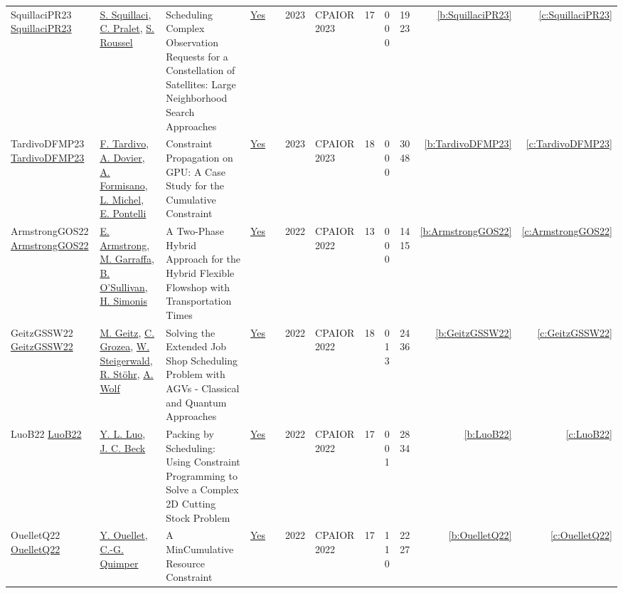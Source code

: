 {\begin{longtable}{>{\raggedright\arraybackslash}p{3cm}>{\raggedright\arraybackslash}p{4.5cm}>{\raggedright\arraybackslash}p{6.0cm}rrrp{2.5cm}rp{1cm}p{1cm}rr}
SquillaciPR23 \href{https://doi.org/10.1007/978-3-031-33271-5_29}{SquillaciPR23} & \hyperref[auth:a20]{S. Squillaci}, \hyperref[auth:a21]{C. Pralet}, \hyperref[auth:a22]{S. Roussel} & Scheduling Complex Observation Requests for a Constellation of Satellites: Large Neighborhood Search Approaches & \href{../works/SquillaciPR23.pdf}{Yes} & \cite{SquillaciPR23} & 2023 & CPAIOR 2023 & 17 & 0 0 0 & 19 23 & \ref{b:SquillaciPR23} & \ref{c:SquillaciPR23}\\
TardivoDFMP23 \href{https://doi.org/10.1007/978-3-031-33271-5_22}{TardivoDFMP23} & \hyperref[auth:a29]{F. Tardivo}, \hyperref[auth:a30]{A. Dovier}, \hyperref[auth:a31]{A. Formisano}, \hyperref[auth:a32]{L. Michel}, \hyperref[auth:a33]{E. Pontelli} & Constraint Propagation on {GPU:} {A} Case Study for the Cumulative Constraint & \href{../works/TardivoDFMP23.pdf}{Yes} & \cite{TardivoDFMP23} & 2023 & CPAIOR 2023 & 18 & 0 0 0 & 30 48 & \ref{b:TardivoDFMP23} & \ref{c:TardivoDFMP23}\\
ArmstrongGOS22 \href{https://doi.org/10.1007/978-3-031-08011-1_1}{ArmstrongGOS22} & \hyperref[auth:a14]{E. Armstrong}, \hyperref[auth:a15]{M. Garraffa}, \hyperref[auth:a16]{B. O'Sullivan}, \hyperref[auth:a17]{H. Simonis} & \cellcolor{green!10}A Two-Phase Hybrid Approach for the Hybrid Flexible Flowshop with Transportation Times & \href{../works/ArmstrongGOS22.pdf}{Yes} & \cite{ArmstrongGOS22} & 2022 & CPAIOR 2022 & 13 & 0 0 0 & 14 15 & \ref{b:ArmstrongGOS22} & \ref{c:ArmstrongGOS22}\\
GeitzGSSW22 \href{https://doi.org/10.1007/978-3-031-08011-1_10}{GeitzGSSW22} & \hyperref[auth:a47]{M. Geitz}, \hyperref[auth:a48]{C. Grozea}, \hyperref[auth:a49]{W. Steigerwald}, \hyperref[auth:a50]{R. St{\"{o}}hr}, \hyperref[auth:a51]{A. Wolf} & \cellcolor{green!10}Solving the Extended Job Shop Scheduling Problem with AGVs - Classical and Quantum Approaches & \href{../works/GeitzGSSW22.pdf}{Yes} & \cite{GeitzGSSW22} & 2022 & CPAIOR 2022 & 18 & 0 1 3 & 24 36 & \ref{b:GeitzGSSW22} & \ref{c:GeitzGSSW22}\\
LuoB22 \href{https://doi.org/10.1007/978-3-031-08011-1_17}{LuoB22} & \hyperref[auth:a745]{Y. L. Luo}, \hyperref[auth:a89]{J. C. Beck} & Packing by Scheduling: Using Constraint Programming to Solve a Complex 2D Cutting Stock Problem & \href{../works/LuoB22.pdf}{Yes} & \cite{LuoB22} & 2022 & CPAIOR 2022 & 17 & 0 0 1 & 28 34 & \ref{b:LuoB22} & \ref{c:LuoB22}\\
OuelletQ22 \href{https://doi.org/10.1007/978-3-031-08011-1_21}{OuelletQ22} & \hyperref[auth:a52]{Y. Ouellet}, \hyperref[auth:a37]{C.-G. Quimper} & A MinCumulative Resource Constraint & \href{../works/OuelletQ22.pdf}{Yes} & \cite{OuelletQ22} & 2022 & CPAIOR 2022 & 17 & 1 1 0 & 22 27 & \ref{b:OuelletQ22} & \ref{c:OuelletQ22}\\

\end{longtable}}
